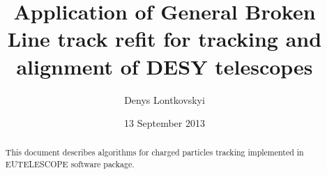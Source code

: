 \documentclass[a4paper,10pt]{article}
\title{Application of General Broken Line track refit for tracking and alignment of DESY telescopes}
\author{Denys Lontkovskyi}
\date{13 September 2013}
\begin{document}
\maketitle

\begin{abstract}
This document describes algorithms for charged particles tracking implemented in EUTELESCOPE software package.
\end{abstract}


\end{document}
